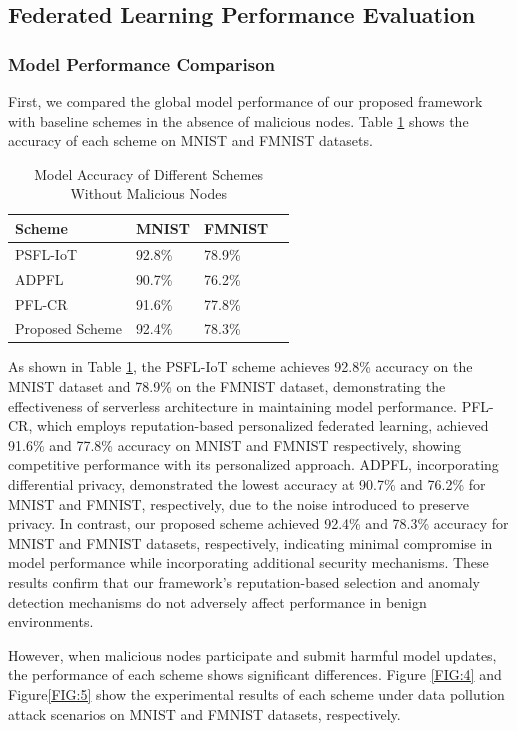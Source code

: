 \documentclass[a4paper]{cas-dc}
\begin{document}
\subsection{Federated Learning Performance Evaluation}
\subsubsection{Model Performance Comparison}
First, we compared the global model performance of our proposed framework with baseline schemes in the absence of malicious nodes. Table \ref{tb1} shows the accuracy of each scheme on MNIST and FMNIST datasets.

	\begin{table}[htbp]
	\centering
	\caption{Model Accuracy of Different Schemes Without Malicious Nodes} \label{tb1}
	\begin{tabular*}{0.99\textwidth}{@{\extracolsep{\fill}} llll}
		\toprule
		\textbf{Scheme}                  & \textbf{MNIST} & \textbf{FMNIST} \\
		\midrule
		PSFL-IoT\cite{65} & 92.8\% & 78.9\% \\
		ADPFL\cite{12} & 90.7\% & 76.2\% \\
		PFL-CR\cite{64} & 91.6\% & 77.8\% \\
		Proposed Scheme & 92.4\% & 78.3\% \\
		\bottomrule
	\end{tabular*}
\end{table}
As shown in Table \ref{tb1}, the PSFL-IoT scheme achieves 92.8\% accuracy on the MNIST dataset and 78.9\% on the FMNIST dataset, demonstrating the effectiveness of serverless architecture in maintaining model performance. PFL-CR, which employs reputation-based personalized federated learning, achieved 91.6\% and 77.8\% accuracy on MNIST and FMNIST respectively, showing competitive performance with its personalized approach. ADPFL, incorporating differential privacy, demonstrated the lowest accuracy at 90.7\% and 76.2\% for MNIST and FMNIST, respectively, due to the noise introduced to preserve privacy. In contrast, our proposed scheme achieved 92.4\% and 78.3\% accuracy for MNIST and FMNIST datasets, respectively, indicating minimal compromise in model performance while incorporating additional security mechanisms. These results confirm that our framework's reputation-based selection and anomaly detection mechanisms do not adversely affect performance in benign environments.

However, when malicious nodes participate and submit harmful model updates, the performance of each scheme shows significant differences. Figure \ref{FIG:4} and Figure\ref{FIG:5} show the experimental results of each scheme under data pollution attack scenarios on MNIST and FMNIST datasets, respectively.
\end{document}
